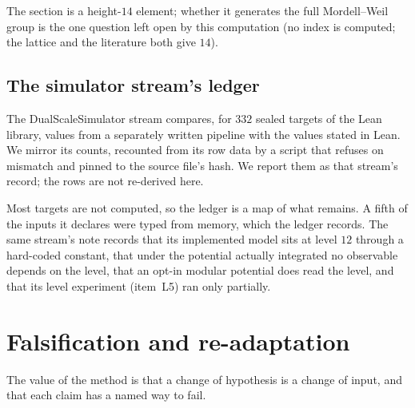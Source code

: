 \documentclass[11pt,a4paper]{article}
\theoremstyle{remark}
\begin{document}
The section is a height-$14$ element; whether it generates the full Mordell--Weil group is the one question left open by this
computation (no index is computed; the lattice and the literature both give $14$).

\subsection{The simulator stream's ledger}\label{sec:sim}

The DualScaleSimulator stream compares, for $332$ sealed targets of the Lean library, values from a separately written pipeline with
the values stated in Lean. We mirror its counts, recounted from its row data by a script that refuses on mismatch and pinned to the
source file's hash. We report them as that stream's record; the rows are not re-derived here.

\begin{table}[h]
\centering\small

\caption{The simulator stream's ledger, mirrored (source commit and hash pinned in \texttt{refs/}). ``Rigid'' there means a selecting
condition that never mentions the target value was scanned for one parameter.}\label{tab:ledger}
\end{table}

Most targets are not computed, so the ledger is a map of what remains. A fifth of the inputs it declares were typed from memory, which
the ledger records. The same stream's note records that its implemented model sits at level $12$ through a hard-coded constant, that
under the potential actually integrated no observable depends on the level, that an opt-in modular potential does read the level, and
that its level experiment (item~L5) ran only partially.

\section{Falsification and re-adaptation}\label{sec:falsify}

The value of the method is that a change of hypothesis is a change of input, and that each claim has a named way to fail.
\end{document}
